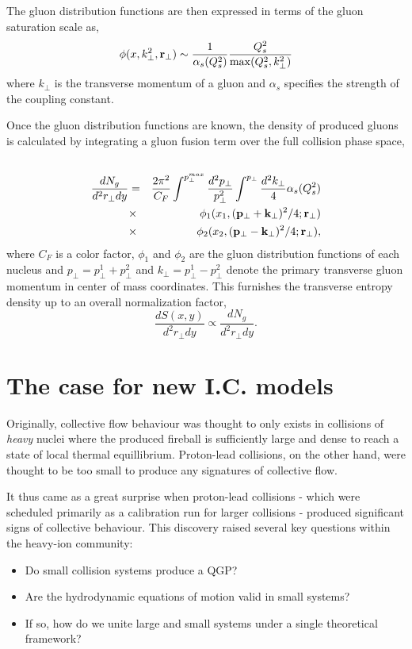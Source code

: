 \documentclass[aps,prc,reprint,amsmath,nofootinbib]{revtex4-1}
\begin{document}
The gluon distribution functions are then expressed in terms of the gluon saturation scale as,
\begin{equation}
 \phi(x,k^2_\perp,{\bf r}_\perp) \sim \frac{1}{\alpha_s(Q_s^2)}\frac{Q_s^2}{\max(Q_s^2,k_\perp^2)}
\end{equation}
where $k_\perp$ is the transverse momentum of a gluon and $\alpha_s$ specifies the strength of the coupling constant. 

Once the gluon distribution functions are known, the density of produced gluons is calculated by integrating a gluon fusion term over the full collision phase space,
\begin{eqnarray}
 \cr \frac{dN_g}{d^2r_\perp dy} &=& \frac{2 \pi^2}{C_F} \int^{p_\perp^{max}} \frac{d^2 p_\perp}{p_\perp^2} \int^{p_\perp} \frac{d^2 k_\perp}{4} \alpha_s(Q_s^2) \\
 &\times& \phi_1(x_1,({\bf p}_\perp + {\bf k}_\perp)^2/4; {\bf r}_\perp) \\
 &\times& \phi_2(x_2,({\bf p}_\perp - {\bf k}_\perp)^2/4; {\bf r}_\perp),
\end{eqnarray}
where $C_F$ is a color factor, $\phi_1$ and $\phi_2$ are the gluon distribution functions of each nucleus and $p_\perp = p_\perp^1 + p_\perp^2$ and 
$k_\perp = p_\perp^1 - p_\perp^2$ denote the primary transverse gluon momentum in center of mass coordinates. This furnishes the transverse entropy density up to an 
overall normalization factor,
\begin{equation}
 \frac{dS(x,y)}{d^2r_\perp dy} \propto \frac{dN_g}{d^2r_\perp dy}.
\end{equation}

\section{The case for new I.C. models}

Originally, collective flow behaviour was thought to only exists in collisions of \emph{heavy} nuclei where the produced fireball is sufficiently large and dense to reach 
a state of local thermal equillibrium. Proton-lead collisions, on the other hand, were thought to be too small to produce any signatures of collective flow.

It thus came as a great surprise when proton-lead collisions - which were scheduled primarily as a calibration run for larger collisions - produced significant signs of 
collective behaviour. This discovery raised several key questions within the heavy-ion community:
\begin{itemize}
 \item Do small collision systems produce a QGP? 
 \item Are the hydrodynamic equations of motion valid in small systems?
 \item If so, how do we unite large and small systems under a single theoretical framework?
\end{itemize}
\end{document}
